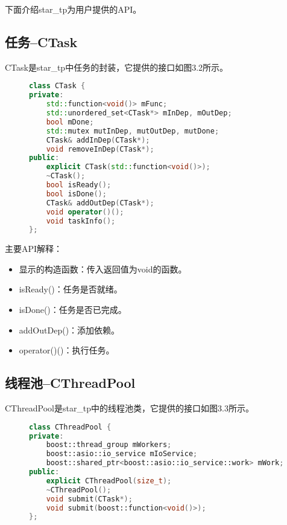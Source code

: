 下面介绍star\_tp为用户提供的API。

\subsection{任务--CTask}

CTask是star\_tp中任务的封装，它提供的接口如图3.2所示。

\begin{figure}[!htbp]
    \centering
\begin{lstlisting}[language=c++,caption={}]
class CTask {
private:
    std::function<void()> mFunc;
    std::unordered_set<CTask*> mInDep, mOutDep;
    bool mDone;
    std::mutex mutInDep, mutOutDep, mutDone;
    CTask& addInDep(CTask*);
    void removeInDep(CTask*);
public:
    explicit CTask(std::function<void()>);
    ~CTask();
    bool isReady();
    bool isDone();
    CTask& addOutDep(CTask*);
    void operator()();
    void taskInfo();
};
\end{lstlisting}
    \label{fig:3_ctask}
\end{figure}

主要API解释：

\begin{itemize}
	\item 显示的构造函数：传入返回值为void的函数。
	\item isReady()：任务是否就绪。
	\item isDone()：任务是否已完成。
	\item addOutDep()：添加依赖。
	\item operator()()：执行任务。
\end{itemize}

\subsection{线程池--CThreadPool}

CThreadPool是star\_tp中的线程池类，它提供的接口如图3.3所示。

\begin{figure}[!htbp]
    \centering
\begin{lstlisting}[language=c++,caption={}]
class CThreadPool {
private:
    boost::thread_group mWorkers;
    boost::asio::io_service mIoService;
    boost::shared_ptr<boost::asio::io_service::work> mWork;
public:
    explicit CThreadPool(size_t);
    ~CThreadPool();
    void submit(CTask*);
    void submit(boost::function<void()>);
};
\end{lstlisting}
    \label{fig:3_cthreadpool}
\end{figure}

